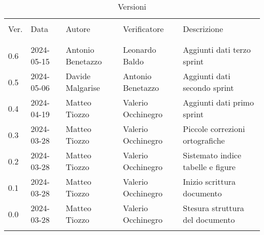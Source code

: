 \documentclass[12pt]{article} %
\begin{document}


\newpage



\begin{table}[!h]
	\footnotesize
	\begin{center}
		\caption*{Versioni}
		\vspace{0.5cm}
		\begin{tabular}{ l l l l p{6cm} }
			\hline                                                                                          \\[-2ex]
			Ver. & Data       & Autore             & Verificatore       & Descrizione                       \\
			\\[-2ex] \hline \\[-1.5ex]
			0.6  & 2024-05-15 & Antonio Benetazzo  & Leonardo Baldo     & Aggiunti dati terzo sprint        \\
			0.5  & 2024-05-06 & Davide Malgarise   & Antonio Benetazzo  & Aggiunti dati secondo sprint      \\
			0.4  & 2024-04-19 & Matteo Tiozzo      & Valerio Occhinegro & Aggiunti dati primo sprint        \\
			0.3  & 2024-03-28 & Matteo Tiozzo      & Valerio Occhinegro & Piccole correzioni ortografiche   \\
			0.2  & 2024-03-28 & Matteo Tiozzo      & Valerio Occhinegro & Sistemato indice tabelle e figure \\
			0.1  & 2024-03-28 & Matteo Tiozzo      & Valerio Occhinegro & Inizio scrittura documento        \\
			0.0  & 2024-03-28 & Matteo Tiozzo      & Valerio Occhinegro & Stesura struttura del documento   \\
			\\[-1.5ex] \hline
		\end{tabular}
	\end{center}
\end{table}

\newpage

\tableofcontents

\newpage

\listoftables

\listoffigures

\newpage



\newpage



\newpage



\newpage



\newpage


\end{document}
